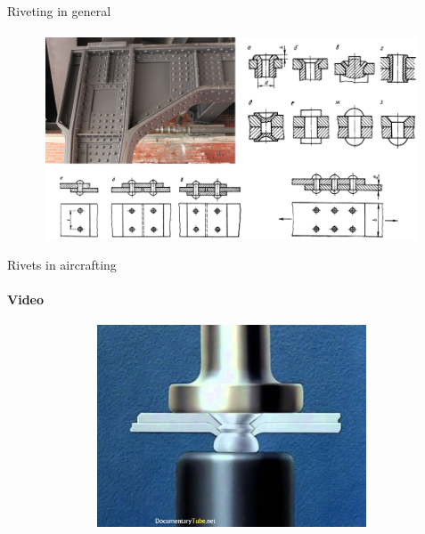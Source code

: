 \documentclass[aspectratio=169]{beamer}
\begin{document}
\begin{frame}[t]{Riveting in general}
    \framesubtitle{}
    \vspace{-0.6cm}
    \begin{figure}[H]
        \centering\includegraphics[height=6cm,width=1\textwidth,keepaspectratio]{rivets.png}
        \label{fig:rivets.png}
    \end{figure}
\end{frame}

\begin{frame}[t]{Rivets in aircrafting}
    \framesubtitle{Video}
    \vspace{-0.6cm}
    \begin{figure}[H]
        \href{https://youtu.be/IDbTUt3OG9s}{
            \centering\includegraphics[height=6cm,width=1\textwidth,keepaspectratio]{rivets_aircrafts_video.jpg}}
        \label{fig:rivets_aircrafts_video.jpg}
    \end{figure}
\end{frame}
\end{document}
